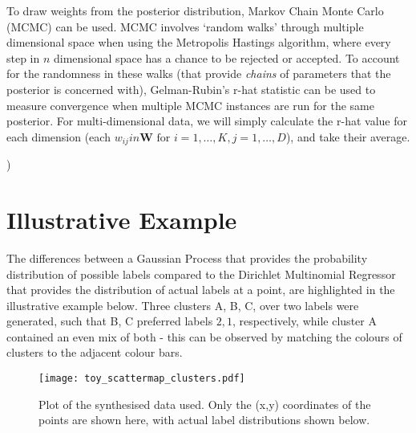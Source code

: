 To draw weights from the posterior distribution, Markov Chain Monte Carlo (MCMC) can be used. MCMC involves `random walks' through multiple dimensional space when using the Metropolis Hastings algorithm, where every step in $n$ dimensional space has a chance to be rejected or accepted. To account for the randomness in these walks (that provide \textit{chains} of parameters that the posterior is concerned with), Gelman-Rubin's r-hat statistic can be used to measure convergence when multiple MCMC instances are run for the same posterior. For multi-dimensional data, we will simply calculate the r-hat value for each dimension (each $w_{ij} in \mathbf{W} \text{ for } i=1,\ldots,K, j=1,\ldots,D$), and take their average.

)


\section{Illustrative Example}

The differences between a Gaussian Process that provides the probability distribution of possible labels compared to the Dirichlet Multinomial Regressor that provides the distribution of actual labels at a point, are highlighted in the illustrative example below. Three clusters A, B, C, over two labels were generated, such that B, C preferred labels $2, 1$, respectively, while cluster A contained an even mix of both - this can be observed by matching the colours of clusters to the adjacent colour bars.


\begin{figure}[H]
    \centerline{\texttt{[image: toy\_scattermap\_clusters.pdf]}}
    \caption{Plot of the synthesised data used. Only the {(x,y)} coordinates of the points are shown here, with actual label distributions shown below.}
    \label{fig:dm_toyplot}
\end{figure}

